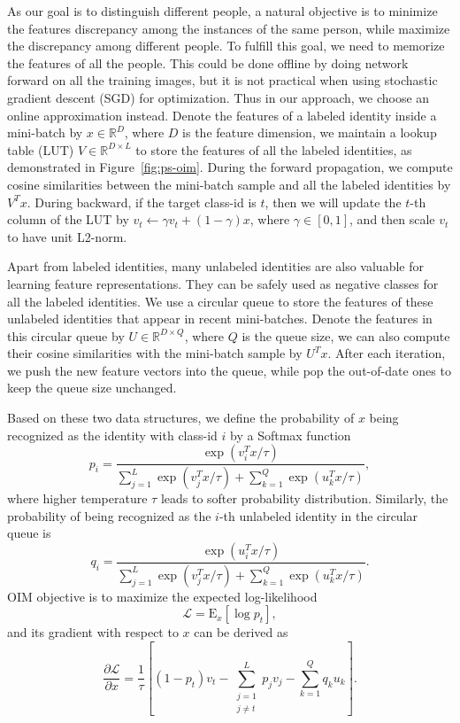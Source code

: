 As our goal is to distinguish different people, a natural objective is to minimize the features discrepancy among the instances of the same person, while maximize the discrepancy among different people. To fulfill this goal, we need to memorize the features of all the people. This could be done offline by doing network forward on all the training images, but it is not practical when using stochastic gradient descent (SGD) for optimization. Thus in our approach, we choose an online approximation instead. Denote the features of a labeled identity inside a mini-batch by $x\in \mathbb{R}^D$, where $D$ is the feature dimension, we maintain a lookup table (LUT) $V\in \mathbb{R}^{D\times L}$ to store the features of all the labeled identities, as demonstrated in Figure~\ref{fig:ps-oim}. During the forward propagation, we compute cosine similarities between the mini-batch sample and all the labeled identities by $V^T x$. During backward, if the target class-id is $t$, then we will update the $t$-th column of the LUT by $v_t \gets \gamma v_t + (1-\gamma) x$, where $\gamma \in [0, 1]$, and then scale $v_t$ to have unit L2-norm.

Apart from labeled identities, many unlabeled identities are also valuable for learning feature representations. They can be safely used as negative classes for all the labeled identities. We use a circular queue to store the features of these unlabeled identities that appear in recent mini-batches. Denote the features in this circular queue by $U\in \mathbb{R}^{D\times Q}$, where $Q$ is the queue size, we can also compute their cosine similarities with the mini-batch sample by $U^Tx$. After each iteration, we push the new feature vectors into the queue, while pop the out-of-date ones to keep the queue size unchanged.

Based on these two data structures, we define the probability of $x$ being recognized as the identity with class-id $i$ by a Softmax function
\begin{equation} \label{eq:ps-pi}
p_i=\frac{\exp(v_i^Tx/\tau)}{\sum_{j=1}^L\exp(v_j^Tx/\tau)+\sum_{k=1}^Q\exp(u_k^Tx/\tau)},
\end{equation}
where higher temperature $\tau$ leads to softer probability distribution. Similarly, the probability of being recognized as the $i$-th unlabeled identity in the circular queue is
\begin{equation} \label{eq:ps-qi}
q_i=\frac{\exp(u_i^Tx/\tau)}{\sum_{j=1}^L\exp(v_j^Tx/\tau)+\sum_{k=1}^Q\exp(u_k^Tx/\tau)}.
\end{equation}
OIM objective is to maximize the expected log-likelihood
\begin{equation} \label{eq:ps-loglik}
\mathcal{L}=\mathrm{E}_x\left[\log p_t\right],
\end{equation}
and its gradient with respect to $x$ can be derived as
\begin{equation}
\frac{\partial \mathcal{L}}{\partial x}=\frac{1}{\tau}\left[(1-p_t)v_t - \sum_{\substack{j=1\\j\ne t}}^L p_j v_j - \sum_{k=1}^Q q_k u_k\right].
\end{equation}

